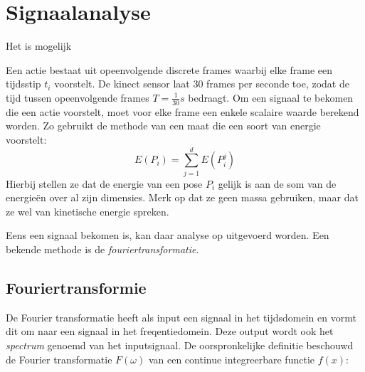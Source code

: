 %







\chapter{Signaalanalyse}
Het is mogelijk 



Een actie bestaat uit opeenvolgende discrete frames waarbij elke frame een tijdsstip $t_i$ voorstelt. De kinect sensor laat 30 frames per seconde toe, zodat de tijd tussen opeenvolgende frames $T = \frac{1}{30}s$ bedraagt. Om een signaal te bekomen die een actie voorstelt, moet voor elke frame een enkele scalaire waarde berekend worden. Zo gebruikt de methode van \cite{Shan2014} een maat die een soort van energie voorstelt:
$$E(P_i) = \sum_{j = 1}^{d}E(P_i^j)$$
Hierbij stellen ze dat de energie van een pose $P_i$ gelijk is aan de som van de energieën over al zijn dimensies. Merk op dat ze geen massa gebruiken, maar dat ze wel van kinetische energie spreken. 




Eens een signaal bekomen is, kan daar analyse op uitgevoerd worden. Een bekende methode is de \textit{fouriertransformatie}.

\section{Fouriertransformie}
De Fourier transformatie heeft als input een signaal in het tijdsdomein en vormt dit om naar een signaal in het freqentiedomein. Deze output wordt ook het \textit{spectrum} genoemd van het inputsignaal. De oorspronkelijke definitie beschouwd de Fourier transformatie $F(\omega)$ van een continue integreerbare functie $f(x)$:

